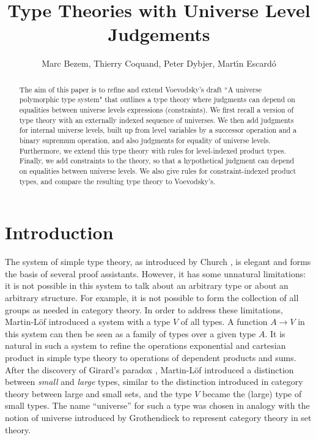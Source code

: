 \documentclass[11pt,a4paper]{article}
\theoremstyle{definition}
\begin{document}
\title{Type Theories with Universe Level Judgements}

\author{Marc Bezem, Thierry Coquand, Peter Dybjer, Mart\'{\i}n Escard\'o}
\date{}
\maketitle

\begin{abstract}

 The aim of this paper is to refine and extend Voevodsky's draft ``A universe polymorphic type system" that outlines a type theory where judgments can depend on equalities between universe levels expressions (constraints). We first recall a version of type theory with an externally indexed sequence of universes. We then add judgments for internal universe levels, built up from level variables by a successor operation and a binary supremum operation, and also judgments for equality of universe levels. Furthermore, we extend this type theory with rules for level-indexed product types. Finally, we add constraints to the theory, so that a hypothetical judgment can depend on equalities between universe levels. We also give rules for constraint-indexed product types, and compare the resulting type theory to Voevodsky's.

\end{abstract}


\section{Introduction}\label{sec:intro}

The system of simple type theory, 
as introduced by Church \cite{church:formulation},
is elegant and forms the basis of several proof assistants. 
However, it has some unnatural limitations: 
it is not possible in this system to talk
about an arbitrary type or about an arbitrary structure. 
For example, it is not possible to form the collection of all groups 
as needed in category theory. In order to address these limitations, 
Martin-L\"of \cite{ML71,ML71a} introduced a system with a type $V$ of all types. 
A function $A\rightarrow V$ in this system can then be seen as a family of types 
over a given type $A$. It is natural in such a system to refine
the operations exponential and cartesian product in simple type theory
to operations of dependent products and sums. 
After the discovery of Girard's paradox \cite{Girard71}, 
Martin-L\"of \cite{ML72} introduced a distinction between
{\em small} and {\em large} types, similar to the distinction introduced 
in category theory between large and small sets,
and the type $V$ became the (large) type of small types.
The name ``universe'' for such a type was chosen in analogy with the notion of 
universe introduced by Grothendieck to represent category theory in set theory.
\end{document}
